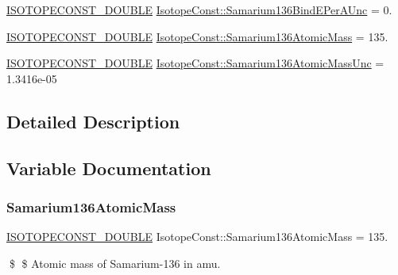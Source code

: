 \begin{DoxyCompactItemize}
\mbox{\hyperlink{group___isotope_const-_macros_ga8f45a7272ce02c0b4c65c44636ed719a}{I\+S\+O\+T\+O\+P\+E\+C\+O\+N\+S\+T\+\_\+\+D\+O\+U\+B\+LE}} \mbox{\hyperlink{group___isotope_const-_samarium-_sm136_ga4d7214ed6e12894941b4e2ac8ece6b0f}{Isotope\+Const\+::\+Samarium136\+Bind\+E\+Per\+A\+Unc}} = 0.
\item 
\mbox{\hyperlink{group___isotope_const-_macros_ga8f45a7272ce02c0b4c65c44636ed719a}{I\+S\+O\+T\+O\+P\+E\+C\+O\+N\+S\+T\+\_\+\+D\+O\+U\+B\+LE}} \mbox{\hyperlink{group___isotope_const-_samarium-_sm136_gae385f1e23bf82f49ddd7311b8ec7053d}{Isotope\+Const\+::\+Samarium136\+Atomic\+Mass}} = 135.
\item 
\mbox{\hyperlink{group___isotope_const-_macros_ga8f45a7272ce02c0b4c65c44636ed719a}{I\+S\+O\+T\+O\+P\+E\+C\+O\+N\+S\+T\+\_\+\+D\+O\+U\+B\+LE}} \mbox{\hyperlink{group___isotope_const-_samarium-_sm136_ga62a299f8cf806de3257abdad4fc1a8b2}{Isotope\+Const\+::\+Samarium136\+Atomic\+Mass\+Unc}} = 1.\+3416e-\/05
\end{DoxyCompactItemize}


\subsection{Detailed Description}


\subsection{Variable Documentation}
\mbox{\label{group___isotope_const-_samarium-_sm136_gae385f1e23bf82f49ddd7311b8ec7053d}} 
\subsubsection{\texorpdfstring{Samarium136\+Atomic\+Mass}{Samarium136AtomicMass}}
{\footnotesize\ttfamily \mbox{\hyperlink{group___isotope_const-_macros_ga8f45a7272ce02c0b4c65c44636ed719a}{I\+S\+O\+T\+O\+P\+E\+C\+O\+N\+S\+T\+\_\+\+D\+O\+U\+B\+LE}} Isotope\+Const\+::\+Samarium136\+Atomic\+Mass = 135.}

\$ \$ Atomic mass of Samarium-\/136 in amu. \mbox{\label{group___isotope_const-_samarium-_sm136_ga62a299f8cf806de3257abdad4fc1a8b2}} 
